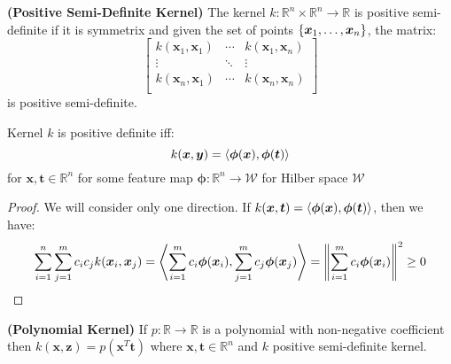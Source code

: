 \begin{definition}{\textbf{(Positive Semi-Definite Kernel)}}
    The kernel $k : \mathbb{R}^n\times \mathbb{R}^n \rightarrow \mathbb{R}$ is positive semi-definite if it is symmetrix and given the set of points $\left\{ \boldsymbol x_1,\dots,\boldsymbol x_n \right\}$, the matrix:
    \begin{equation*}
        \begin{bmatrix}
            k(\boldsymbol x_1,\boldsymbol x_1) & \cdots & k(\boldsymbol x_1, \boldsymbol x_n) \\
            \vdots & \ddots & \vdots \\
            k(\boldsymbol x_n,\boldsymbol x_1) & \cdots & k(\boldsymbol x_n, \boldsymbol x_n) \\
        \end{bmatrix}
    \end{equation*}
    is positive semi-definite. 
\end{definition}

\begin{theorem}
    Kernel $k$ is positive definite iff:
    \begin{equation*}
        k(\boldsymbol x, \boldsymbol y) = \left\langle \boldsymbol \phi(\boldsymbol x), \boldsymbol \phi(\boldsymbol t) \right\rangle
    \end{equation*}
    for $\boldsymbol x, \boldsymbol t \in \mathbb{R}^n$ for some feature map $\boldsymbol \phi : \mathbb{R}^n \rightarrow \mathcal{W}$ for Hilber space $\mathcal{W}$
\end{theorem}
\begin{proof}
    We will consider only one direction. If $k(\boldsymbol x, \boldsymbol t) = \left\langle \boldsymbol \phi(\boldsymbol x), \boldsymbol \phi(\boldsymbol t) \right\rangle$, then we have:
    \begin{equation*}
        \sum^n_{i=1}\sum^m_{j=1}c_ic_jk(\boldsymbol x_i, \boldsymbol x_j) = \left\langle \sum^m_{i=1}c_i\boldsymbol \phi(\boldsymbol x_i), \sum^m_{j=1}c_j\boldsymbol \phi(\boldsymbol x_j) \right\rangle =\left\lVert\sum^m_{i=1}c_i\boldsymbol \phi(\boldsymbol x_i)\right\rVert^2 \ge 0
    \end{equation*}
\end{proof}

\begin{definition}{\textbf{(Polynomial Kernel)}}
    If $p:\mathbb{R}\rightarrow \mathbb{R}$ is a polynomial with non-negative coefficient then $k(\boldsymbol x, \boldsymbol z) = p (\boldsymbol x^T\boldsymbol t)$ where $\boldsymbol x, \boldsymbol t \in \mathbb{R}^n$ and $k$ positive semi-definite kernel. 
\end{definition}

